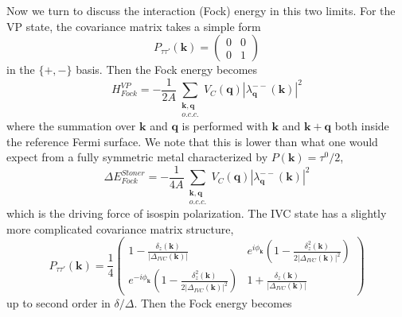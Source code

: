 \documentclass[aps,pra,twocolumn,superscriptaddress,10pt,article,nofootinbib,showpacs,longbibliography]{revtex4-1}
\def \k{{\mathbf k}}
\def \q{{\mathbf q}}
\begin{document}
Now we turn to discuss the interaction (Fock) energy in this two limits. For the VP state, the covariance matrix takes a simple form
\begin{equation}
    P_{\tau \tau'}(\boldsymbol{k}) = \begin{pmatrix}
        0 & 0\\
        0 & 1
    \end{pmatrix}
\end{equation}
in the $\{+,-\}$ basis. Then the Fock energy becomes
\begin{equation}
    H_{Fock}^{VP} = -\frac{1}{2 A} \sum_{\substack{\mathbf{k}, \mathbf{q}\\o.c.c.}} V_C(\boldsymbol{q}) |\lambda^{--}_{\boldsymbol{q}}(\boldsymbol{k})|^2
\end{equation}
where the summation over $\k$ and $\q$ is performed with $\k$ and $\k + \q$ both inside the reference Fermi surface. We note that this is lower than what one would expect from a fully symmetric metal characterized by $P(\k) = \tau^0/2$,
\begin{equation}
    \Delta E_{Fock}^{
    Stoner} = -\frac{1}{4 A} \sum_{\substack{\mathbf{k}, \mathbf{q}\\o.c.c.}} V_C(\boldsymbol{q}) |\lambda^{--}_{\boldsymbol{q}}(\boldsymbol{k})|^2
\end{equation}
which is the driving force of isospin polarization. The IVC state has a slightly more complicated covariance matrix structure,
\begin{equation}
    P_{\tau \tau'}(\boldsymbol{k}) = \frac{1}{4} \begin{pmatrix}
        1 - \frac{ \delta_z(\k)}{\left | \Delta_{IVC}(\k) \right |}  & e^{i \phi_{\mathbf{k}}} \left ( 1 - \frac{ \delta_z^2(\k)}{2\left | \Delta_{IVC}(\k) \right |^2} \right )\\
        e^{-i \phi_{\mathbf{k}}} \left ( 1 - \frac{ \delta_z^2(\k)}{2\left | \Delta_{IVC}(\k) \right |^2} \right ) & 1 + \frac{ \delta_z(\k)}{\left | \Delta_{IVC}(\k) \right |}
    \end{pmatrix}
\end{equation}
up to second order in $\delta/\Delta$. Then the Fock energy becomes
\end{document}
